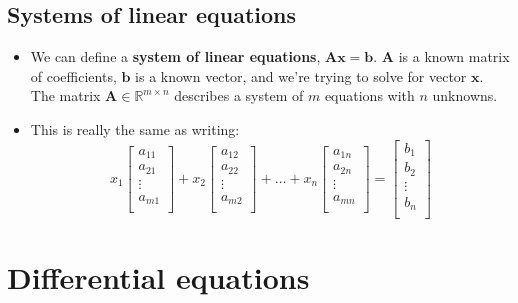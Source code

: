 \documentclass{article}
\begin{document}
\begin{multicols*}{2}
\subsection{Systems of linear equations}
\begin{itemize}
    \item We can define a \textbf{system of linear equations}, $\bm{Ax}=\bm{b}$. $\bm{A}$ is a known matrix of coefficients, $\bm{b}$ is a known vector, and we're trying to solve for vector $\bm{x}$. The matrix $\bm{A} \in \mathbb{R}^{m \times n}$ describes a system of $m$ equations with $n$ unknowns.
    \item This is really the same as writing:
    $$ x_1 \begin{bmatrix}
     a_{11}\\
     a_{21}\\
     \vdots \\
     a_{m1}\\ \end{bmatrix} +
     x_2 \begin{bmatrix}
     a_{12}\\
     a_{22}\\
     \vdots \\
     a_{m2}\\ \end{bmatrix} +
     \hdots +
     x_n \begin{bmatrix}
     a_{1n}\\
     a_{2n}\\
     \vdots \\
     a_{mn}\\ \end{bmatrix} =
     \begin{bmatrix}
     b_{1}\\
     b_{2}\\
     \vdots \\
     b_{n}\\ \end{bmatrix}
     $$
    \end{itemize}

\section{Differential equations}

\end{multicols*}
\end{document}
